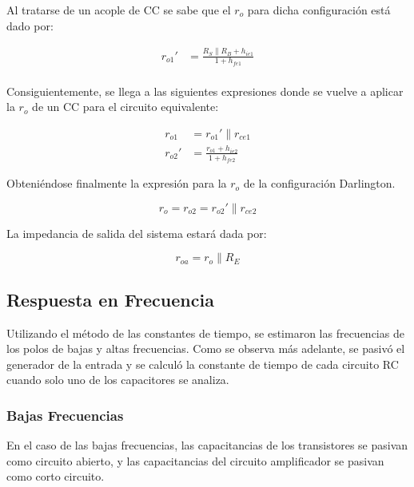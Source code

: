 Al tratarse de un acople de CC se sabe que el $r_o$ para dicha configuración está dado por:

\begin{align}
    r_{o1}'&= \frac{R_S\parallel R_B + h_{ie1}}{1 + h_{fe1}} \\
\end{align}

Consiguientemente, se llega a las siguientes expresiones donde se vuelve a aplicar la $r_o$ de un CC para el 
circuito equivalente:


\begin{align*}
    r_{o1} &= r_{o1}' \parallel r_{ce1} \\
    r_{o2}'&= \frac{r_{o1} + h_{ie2}}{1 + h_{fe2}}
\end{align*}

Obteniéndose finalmente la expresión para la $r_o$ de la configuración Darlington.

\begin{equation}
    r_o = r_{o2} = r_{o2}' \parallel r_{ce2}
\end{equation}

La impedancia de salida del sistema estará dada por:


\begin{equation}
    r_{oa} = r_{o} \parallel R_{E}
\end{equation}
    

\subsection{Respuesta en Frecuencia}
Utilizando el método de las constantes de tiempo, se estimaron las frecuencias de los polos de bajas y altas frecuencias. Como se observa más adelante, se pasivó el generador de la entrada y se calculó la constante de tiempo de cada circuito RC cuando solo uno de los capacitores se analiza.

\subsubsection{Bajas Frecuencias}
En el caso de las bajas frecuencias, las capacitancias de los transistores se pasivan como circuito abierto, y las capacitancias del circuito amplificador se pasivan como corto circuito.


